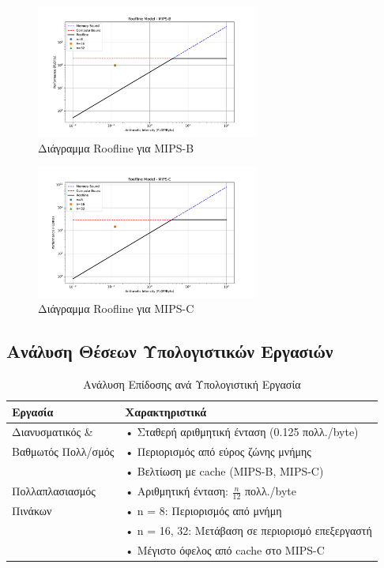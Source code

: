 \documentclass[11pt,a4paper]{article}
\begin{document}
\begin{figure}[ht!]
    \centering
    \includegraphics[width=0.65\textwidth]{roofline_mips_b.pdf}
    \caption{Διάγραμμα Roofline για MIPS-B}
    \label{fig:roofline_b}
\end{figure}

\begin{figure}[ht!]
    \centering
    \includegraphics[width=0.65\textwidth]{roofline_mips_c.pdf}
    \caption{Διάγραμμα Roofline για MIPS-C}
    \label{fig:roofline_c}
\end{figure}

\subsection{Ανάλυση Θέσεων Υπολογιστικών Εργασιών}

\begin{table}[ht!]
\centering
\begin{tabular}{|l|p{10cm}|}
\hline
\textbf{Εργασία} & \textbf{Χαρακτηριστικά} \\
\hline
Διανυσματικός \& & • Σταθερή αριθμητική ένταση (0.125 πολλ./byte) \\
Βαθμωτός Πολλ/σμός & • Περιορισμός από εύρος ζώνης μνήμης \\
& • Βελτίωση με cache (MIPS-B, MIPS-C) \\
\hline
Πολλαπλασιασμός & • Αριθμητική ένταση: $\frac{n}{12}$ πολλ./byte \\
Πινάκων & • n = 8: Περιορισμός από μνήμη \\
& • n = 16, 32: Μετάβαση σε περιορισμό επεξεργαστή \\
& • Μέγιστο όφελος από cache στο MIPS-C \\
\hline
\end{tabular}
\caption{Ανάλυση Επίδοσης ανά Υπολογιστική Εργασία}
\end{table}
\end{document}
